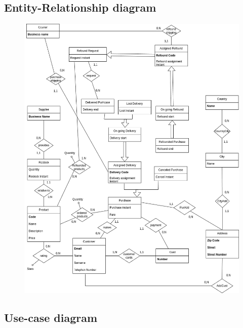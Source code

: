 \documentclass[12pt]{report}
\begin{document}
    \newpage

    \subsection{Entity-Relationship diagram}
    
    \begin{figure}[H]
        \centering
        \includegraphics[scale=0.44]{images/ER-Expanded.png}
        
        \label{fig:entity_rel_diagram}
    \end{figure}
    
    \subsection{Use-case diagram}
    
\end{document}
